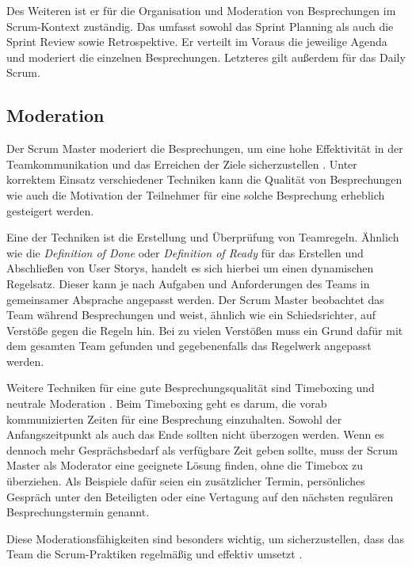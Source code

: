 \documentclass[5pt, final]{beamer}
\begin{document}
\begin{frame}[t]
\begin{multicols}{3}
			Des Weiteren ist er für die Organisation und Moderation von Besprechungen im Scrum-Kontext zuständig.
			Das umfasst sowohl das Sprint Planning als auch die Sprint Review sowie Retrospektive.
			Er verteilt im Voraus die jeweilige Agenda und moderiert die einzelnen Besprechungen.
			Letzteres gilt außerdem für das Daily Scrum.\cite{meindl12}
			
			\subsection{Moderation}
			
			Der Scrum Master moderiert die Besprechungen, um eine hohe Effektivität in der Teamkommunikation und das Erreichen der Ziele sicherzustellen \cite{vantighem24}.
			Unter korrektem Einsatz verschiedener Techniken kann die Qualität von Besprechungen wie auch die Motivation der Teilnehmer für eine solche Besprechung erheblich gesteigert werden.
			
			Eine der Techniken ist die Erstellung und Überprüfung von Teamregeln.
			Ähnlich wie die \textit{Definition of Done} oder \textit{Definition of Ready} für das Erstellen und Abschließen von User Storys, handelt es sich hierbei um einen dynamischen Regelsatz.
			Dieser kann je nach Aufgaben und Anforderungen des Teams in gemeinsamer Absprache angepasst werden.
			Der Scrum Master beobachtet das Team während Besprechungen und weist, ähnlich wie ein Schiedsrichter, auf Verstöße gegen die Regeln hin.
			Bei zu vielen Verstößen muss ein Grund dafür mit dem gesamten Team gefunden und gegebenenfalls das Regelwerk angepasst werden.
			
            Weitere Techniken für eine gute Besprechungsqualität sind Timeboxing und neutrale Moderation \cite{malten24}.
            Beim Timeboxing geht es darum, die vorab kommunizierten Zeiten für eine Besprechung einzuhalten.
            Sowohl der Anfangszeitpunkt als auch das Ende sollten nicht überzogen werden.
            Wenn es dennoch mehr Gesprächsbedarf als verfügbare Zeit geben sollte, muss der Scrum Master als Moderator eine geeignete Lösung finden, ohne die Timebox zu überziehen.
            Als Beispiele dafür seien ein zusätzlicher Termin, persönliches Gespräch unter den Beteiligten oder eine Vertagung auf den nächsten regulären Besprechungstermin genannt.
            
            Diese Moderationsfähigkeiten sind besonders wichtig, um sicherzustellen, dass das Team die Scrum-Praktiken regelmäßig und effektiv umsetzt \cite{vantighem24}.
			

\end{multicols}
\end{frame}
\end{document}
